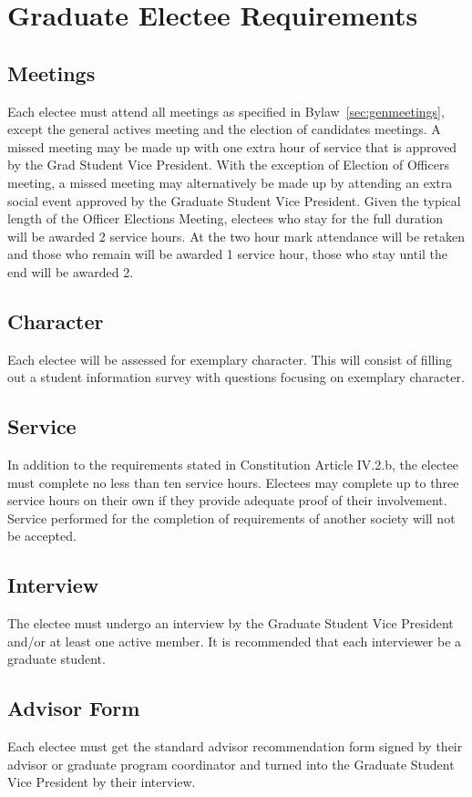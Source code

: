 \chapter{Graduate Electee Requirements}\label{sec:gradreqs}%
\section{Meetings} Each electee must attend all meetings as specified in Bylaw~\ref{sec:genmeetings}, except the general actives meeting and the election of candidates  meetings. A missed meeting may be made up with one extra hour of service that is approved by the Grad Student Vice President. 
With the exception of Election of Officers meeting, a missed meeting may alternatively be made up by attending an extra social event approved by the Graduate Student Vice President. Given the typical length of the Officer Elections Meeting, electees who stay for the full duration will be awarded 2 service hours. At the two hour mark attendance will be retaken and those who remain will be awarded 1 service hour, those who stay until the end will be awarded 2.
\section{Character} Each electee will be assessed for exemplary character. This
will consist of filling out a student information survey with questions focusing on exemplary character.
\section{Service}	In addition to the requirements stated in Constitution Article IV.2.b, the electee must complete no less than ten service hours.  Electees may complete up to three service hours on their own if they provide adequate proof of their involvement. Service performed for the completion of requirements of another society will not be accepted. %
\section{Interview}	The electee must undergo an interview by the Graduate Student Vice President and/or at least one active member. It is recommended that each interviewer be a graduate student. 
\section{Advisor Form}	Each electee must get the standard advisor recommendation form signed by their advisor or graduate program coordinator and turned into the Graduate Student Vice President by their interview.
